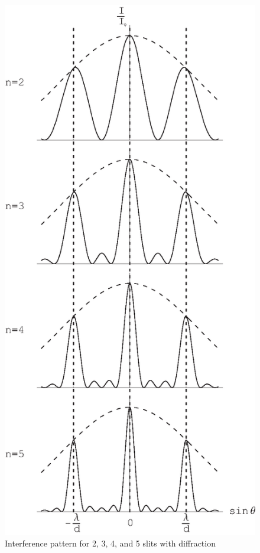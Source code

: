 \begin{figure}
\centering 
\epsfysize=12.5cm \includegraphics[scale=0.6]{10_diffraction/interferencepatt.eps}
\caption{Interference pattern for 2, 3, 4, and 5 slits with diffraction}
\label{fig:diff:intpatt}
\end{figure}

